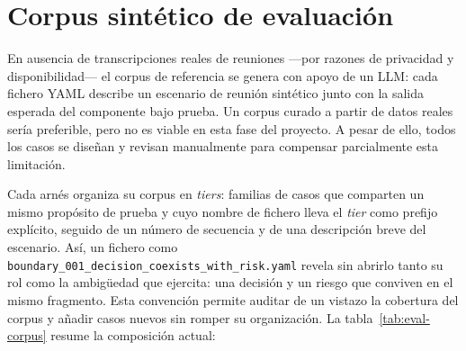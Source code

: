 \section{Corpus sintético de evaluación}

En ausencia de transcripciones reales de reuniones —por razones de privacidad y disponibilidad—
el corpus de referencia se genera con apoyo de un LLM: cada fichero YAML describe un escenario
de reunión sintético junto con la salida esperada del componente bajo prueba. Un corpus
curado a partir de datos reales sería preferible, pero no es viable en esta fase del proyecto.
A pesar de ello, todos los casos se diseñan y revisan manualmente para compensar parcialmente
esta limitación.

Cada arnés organiza su corpus en \textit{tiers}: familias de casos que comparten un mismo
propósito de prueba y cuyo nombre de fichero lleva el \textit{tier} como prefijo explícito,
seguido de un número de secuencia y de una descripción breve del escenario. Así, un fichero
como \texttt{boundary\_001\_decision\_coexists\_with\_risk.yaml} revela sin abrirlo tanto su
rol como la ambigüedad que ejercita: una decisión y un riesgo que conviven en el mismo fragmento.
Esta convención permite auditar de un vistazo la cobertura del corpus y añadir casos nuevos
sin romper su organización. La tabla~\ref{tab:eval-corpus} resume la composición actual:

